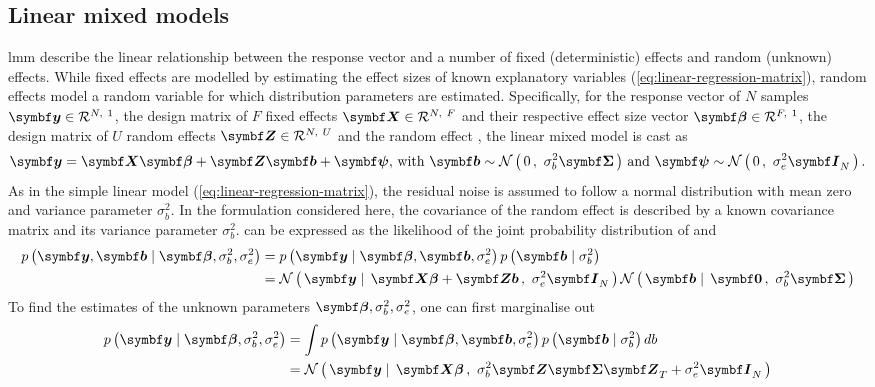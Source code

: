 \subsection{Linear mixed models}
\label{subsection:lmm}
\Gls{lmm} describe the linear relationship between the response vector and a number of fixed (deterministic) effects and random (unknown) effects. While fixed effects are modelled by estimating the effect sizes of known explanatory variables (\cref{eq:linear-regression-matrix}), random effects model a random variable for which distribution parameters are estimated. Specifically, for the response vector of \(N\) samples \(\mat{y} \inR N 1\), the design matrix of \(F\) fixed effects \(\mat{X} \inR N F\) and their respective effect size vector \(\mat{\beta} \inR F 1\), the design matrix of \(U\) random effects \(\mat{Z} \inR N U\) and the random effect , the linear mixed model is cast as
%
\begin{equation}
\mat{y} =\mat{X}\mat{\beta} +\mat{Z}\mat{b}+\mat{\psi},\, \text{with } \mat{b} \sim \normal 0 {\sigma_b^2\mat{\Sigma}}\,\text{and  }\mat{\psi} \sim\normal 0 {\sigma_e^2\mat{I}_N}.
\label{eq:lmm}
\end{equation}
%
As in the simple linear model (\cref{eq:linear-regression-matrix}), the residual noise is assumed to follow a normal distribution with mean zero and variance parameter \(\sigma_b^2\). In the formulation considered here, the covariance of the random effect is described by a known covariance matrix \tmat{\Sigma} and its variance parameter \(\sigma_b^2\). 
%
 can be expressed as the likelihood  of the joint probability distribution of  and 
\begin{align}
p\left(\mat{y}, \mat{b}\mid \mat{\beta},\sigma_b^2, \sigma_e^2\right) &= p\left(\mat{y} \mid \mat{\beta}, \mat{b}, \sigma_e^2\right)p\left(\mat{b}\mid \sigma_b^2\right) \label{eq:lmm-prob} \\
&= \normal {\mat{y} \mid \, \mat{X\beta} + \mat{Zb}}{\sigma_e^2\matsub{I}{N}} \normal {\mat{b} \mid \,\mat{0}}{\sigma_b^2\mat{\Sigma}}\label{eq:lmm-norm}
\end{align}
%
To find the estimates of the unknown parameters \(\mat{\beta}, \sigma_b^2, \sigma_e^2\), one can first marginalise out  
%
\begin{align}
p\left(\mat{y} \mid \mat{\beta},\sigma_b^2, \sigma_e^2\right) &= \int p\left(\mat{y} \mid \mat{\beta}, \mat{b}, \sigma_e^2\right)p\left(\mat{b}\mid \sigma_b^2\right) db \label{eq:lmm-marginal-prob} \\
&= \normal {\mat{y} \mid  \, \mat{X\beta}}{\sigma_b^2\mat{Z}\mat{\Sigma}\matsub{Z}{T} + \sigma_e^2\matsub{I}{N}}  \label{eq:lmm-marginal-norm} 
\end{align}
